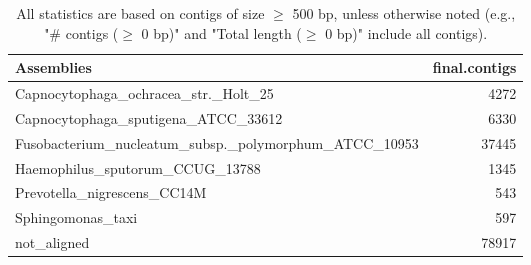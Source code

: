 \documentclass[12pt,a4paper]{article}
\begin{document}
\begin{table}[ht]
\begin{center}
\caption{All statistics are based on contigs of size $\geq$ 500 bp, unless otherwise noted (e.g., "\# contigs ($\geq$ 0 bp)" and "Total length ($\geq$ 0 bp)" include all contigs).}
\begin{tabular}{|l*{1}{|r}|}
\hline
Assemblies & final.contigs \\ \hline
Capnocytophaga\_ochracea\_str.\_Holt\_25 & 4272 \\ \hline
Capnocytophaga\_sputigena\_ATCC\_33612 & 6330 \\ \hline
Fusobacterium\_nucleatum\_subsp.\_polymorphum\_ATCC\_10953 & 37445 \\ \hline
Haemophilus\_sputorum\_CCUG\_13788 & 1345 \\ \hline
Prevotella\_nigrescens\_CC14M & 543 \\ \hline
Sphingomonas\_taxi & 597 \\ \hline
not\_aligned & 78917 \\ \hline
\end{tabular}
\end{center}
\end{table}
\end{document}
